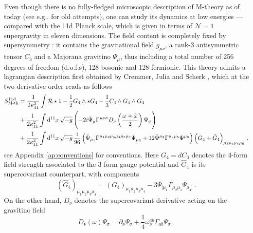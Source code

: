 Even though there is no fully-fledged microscopic description of M-theory as of today (see e.g., \cite{Townsend:1995kk,Banks:1996vh, Seiberg:1997ad,Nicolai:1998ic,Dasgupta:2002iy} for old attempts), one can study its dynamics at low energies --- compared with the 11d Planck scale, which is given in terms of $\mathcal{N}=1$ supergravity in eleven dimensions. The field content is completely fixed by supersymmetry \cite{Nahm:1977tg}: it contains the gravitational field $g_{\mu \nu}$, a rank-3 antisymmetric tensor $C_3$ and a Majorana gravitino $\Psi_{\mu}$, thus including a total number of 256 degrees of freedom (d.o.f.s), 128 bosonic and 128 fermionic. This theory admits a lagrangian description first obtained by Cremmer, Julia and Scherk \cite{Cremmer:1978km}, which at the two-derivative order reads as follows
%
\begin{equation}\label{eq:11daction}
    \begin{aligned}
       S_\text{M-th}^{\text{11d}} &= \frac{1}{2\kappa_{11}^2} \int \mathcal{R} \star 1 - \frac{1}{2} G_4 \wedge \star G_4 -\frac{1}{3} C_3 \wedge G_4 \wedge G_4\\
       &+\frac{1}{2\kappa_{11}^2} \int {\rm d}^{11}x\, \sqrt{-g} \left( -2i \bar\Psi_{\mu} \Gamma^{\mu \nu \sigma} D_{\nu} \left( \frac{\omega + \hat \omega}{2}\right) \Psi_{\sigma}\right)\\
       &+ \frac{1}{2\kappa_{11}^2} \int {\rm d}^{11}x\, \sqrt{-g}\, \frac{\text{i}}{96} \left(\bar\Psi_{\mu_1} \Gamma^{\mu_1 \mu_2 \mu_3 \mu_4 \mu_5 \mu_6} \Psi_{\mu_2} + 12 \bar\Psi^{\mu_3} \Gamma^{\mu_4 \mu_5} \Psi^{\mu_6}\right) \left( G_4 + \hat G_4\right)_{\mu_3 \mu_4 \mu_5 \mu_6}\, ,
    \end{aligned}
\end{equation}
%
see Appendix \ref{ap:conventions} for conventions. Here $G_4=dC_3$ denotes the 4-form field strength associated to the 3-form gauge potential and $\hat G_4$ is its supercovariant counterpart, with components
%
\begin{equation}\label{eq:supercovariant4form}
       (\hat{G}_4)_{\mu_1 \mu_2 \mu_3 \mu_4} =(G_4)_{\mu_1 \mu_2 \mu_3 \mu_4} -3 \bar\Psi_{[\mu_1} \Gamma_{\mu_2 \mu_3} \Psi_{\mu_4]}\, .
\end{equation}
%
On the other hand, $D_{\nu}$ denotes the supercovariant derivative acting on the gravitino field
%
\begin{equation}\label{eq:supercovariantderivative}
       D_{\nu} \left(\omega \right) \Psi_{\sigma} = \partial_{\nu} \Psi_{\sigma} + \frac{1}{4} \omega_{\nu}^{a b} \Gamma_{a b} \Psi_{\sigma}\, ,
\end{equation}
